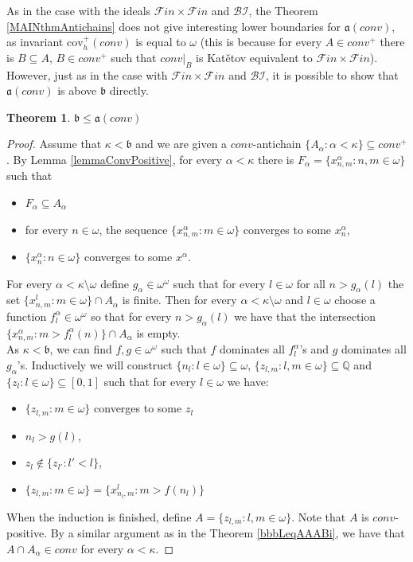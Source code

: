 \documentclass[a4paper]{amsart}
\newtheorem{theorem}{Theorem}[section]
\newcommand{\aaa}{\mathfrak{a}}
\newcommand{\bbb}{\mathfrak{b}}
\newcommand{\Baire}{\omega^{\omega}}
\newcommand{\cov}{\mathrm{cov}}
\newcommand{\FF}{\mathcal{F}in\times\mathcal{F}in}
\newcommand{\conv}{conv}
\newcommand{\BI}{\mathcal{BI}}
\begin{document}
As in the case with the ideals $\FF$ and $\BI$, the Theorem \ref{MAINthmAntichains} does not give interesting lower boundaries for $\aaa(\conv)$, as invariant $\cov^{+}_{h}(\conv)$ is equal to $\omega$ (this is because for every $A\in\conv^{+}$ there is $B\subseteq A$, $B\in\conv^{+}$ such that $\conv|_{B}$ is Katětov equivalent to $\FF$). However, just as in the case with $\FF$ and $\BI$, it is possible to show that $\aaa(\conv)$ is above $\bbb$ directly.
\begin{theorem}
    $\bbb\leq\aaa(\conv)$
\end{theorem}
\begin{proof}
    Assume that $\kappa<\bbb$ and we are given a $\conv$-antichain $\{A_{\alpha}:\alpha<\kappa\}\subseteq\conv^{+}$. By Lemma \ref{lemmaConvPositive}, for every $\alpha<\kappa$ there is $F_{\alpha}=\{x^{\alpha}_{n,m}:n,m\in\omega\}$ such that
    \begin{itemize}
        \item[--] $F_{\alpha}\subseteq A_{\alpha}$
        \item[--] for every $n\in\omega$, the sequence $\{x^{\alpha}_{n,m}:m\in\omega\}$ converges to some $x^{\alpha}_{n}$,
        \item[--] $\{x^{\alpha}_{n}:n\in\omega\}$ converges to some $x^{\alpha}$.
    \end{itemize}
    For every $\alpha<\kappa\setminus\omega$ define $g_{\alpha}\in\Baire$ such that for every $l\in\omega$ for all $n>g_{\alpha}(l)$ the set $\{x^{l}_{n,m}:m\in\omega\}\cap A_{\alpha}$ is finite. Then for every $\alpha<\kappa\setminus\omega$ and $l\in\omega$ choose a function $f^{\alpha}_{l}\in\Baire$ so that for every $n>g_{\alpha}(l)$ we have that the intersection $\{x^{\alpha}_{n,m}:m>f^{\alpha}_{l}(n)\}\cap A_{\alpha}$ is empty.\\
    As $\kappa<\bbb$, we can find $f,g\in\Baire$ such that $f$ dominates all $f^{\alpha}_{l}$'s and $g$ dominates all $g_{\alpha}$'s. Inductively we will construct $\{n_{l}:l\in\omega\}\subseteq\omega$, $\{z_{l,m}:l,m\in\omega\}\subseteq\mathbb{Q}$ and $\{z_{l}:l\in\omega\}\subseteq[0,1]$ such that for every $l\in\omega$ we have:
    \begin{itemize}
        \item[--] $\{z_{l,m}:m\in\omega\}$ converges to some $z_{l}$
        \item[--] $n_{l}>g(l)$,
        \item[--] $z_{l}\notin\{z_{l'}:l'<l\}$,
        \item[--] $\{z_{l,m}:m\in\omega\}=\{x^{l}_{n_{l},m}:m>f(n_{l})\}$
    \end{itemize}
    When the induction is finished, define $A=\{z_{l,m}:l,m\in\omega\}$. Note that $A$ is $\conv$-positive. By a similar argument as in the Theorem \ref{bbbLeqAAABi}, we have that $A\cap A_{\alpha}\in\conv$ for every $\alpha<\kappa$.
\end{proof}
\end{document}
